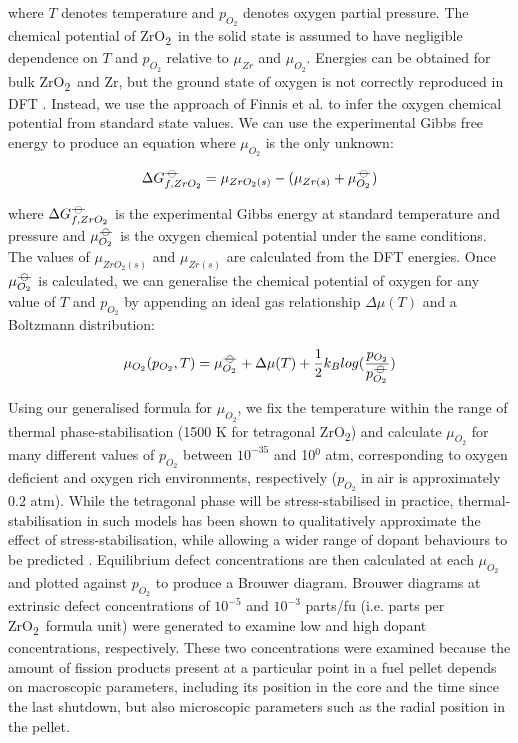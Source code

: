 \documentclass[11pt,a4paper]{article}
\newcommand{\zirconia}{ZrO\textsubscript{2}}
\newcommand*{\plimsoll}{{\ensuremath{-\kern-4pt{\ominus}\kern-4pt-}}}
\begin{document}
where $T$ denotes temperature and $p_{O_2}$ denotes oxygen partial pressure. The chemical potential of \zirconia\ in the solid state is assumed to have negligible dependence on $T$ and $p_{O_2}$ relative to ${\mu}_{Zr}$ and ${\mu}_{O_2}$. Energies can be obtained for bulk \zirconia\ and Zr, but the ground state of oxygen is not correctly reproduced in DFT \cite{Batyrev2000, Lozovoi2001}. Instead, we use the approach of Finnis et al. \cite{Finnis2005} to infer the oxygen chemical potential from standard state values. We can use the experimental Gibbs free energy to produce an equation where $\mu_{O_2}$ is the only unknown:

\begin{equation}
\Delta{G^{\plimsoll}_{f, ZrO_2}} = \mu_{ZrO_2(s)} - (\mu_{Zr(s)} + \mu^{\plimsoll}_{O_2})
\end{equation}

where $\Delta{G^{\plimsoll}_{f, ZrO_2}}$ is the experimental Gibbs energy at standard temperature and pressure and $\mu^{\plimsoll}_{O_2}$ is the oxygen chemical potential under the same conditions. The values of $\mu_{ZrO_2(s)}$ and $\mu_{Zr(s)}$ are calculated from the DFT energies. Once $\mu^{\plimsoll}_{O_2}$ is calculated, we can generalise the chemical potential of oxygen for any value of $T$ and $p_{O_2}$ by appending an ideal gas relationship $\Delta{\mu(T)}$ and a Boltzmann distribution:

\begin{equation}
\mu_{O_2}(p_{O_2},T) = \mu^{\plimsoll}_{O_2} + \Delta{\mu(T)} + \frac{1}{2}{k_B}log(\frac{p_{O_2}}{p^{\plimsoll}_{O_2}})
\end{equation}

Using our generalised formula for $\mu_{O_2}$, we fix the temperature within the range of thermal phase-stabilisation (1500 K for tetragonal \zirconia) and calculate $\mu_{O_2}$ for many different values of $p_{O_2}$ between $10^{-35}$ and 10$^{0}$ atm, corresponding to oxygen deficient and oxygen rich environments, respectively ($p_{O_2}$ in air is approximately 0.2 atm). While the tetragonal phase will be stress-stabilised in practice, thermal-stabilisation in such models has been shown to qualitatively approximate the effect of stress-stabilisation, while allowing a wider range of dopant behaviours to be predicted \cite{Bell2016}. Equilibrium defect concentrations are then calculated at each $\mu_{O_2}$ and plotted against $p_{O_2}$ to produce a Brouwer diagram. Brouwer diagrams at extrinsic defect concentrations of $10^{-5}$ and $10^{-3}$ parts/fu (i.e. parts per \zirconia\ formula unit) were generated to examine low and high dopant concentrations, respectively. These two concentrations were examined because the amount of fission products present at a particular point in a fuel pellet depends on macroscopic parameters, including its position in the core and the time since the last shutdown, but also microscopic parameters such as the radial position in the pellet. %
\end{document}
